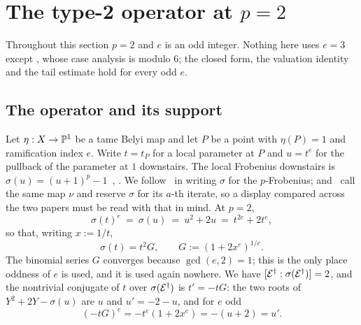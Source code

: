 
\section{The type-2 operator at \texorpdfstring{$p = 2$}{p = 2}}
\label{sec:local}

Throughout this section $p = 2$ and $e$ is an odd integer. Nothing here
uses $e = 3$ except , whose case analysis is modulo $6$;
the closed form, the valuation identity and the tail estimate hold for
every odd $e$.

\subsection{The operator and its support}
\label{sec:operator}

Let $\eta : X \to \mathbb{P}^1$ be a tame Belyi map and let $P$ be a point with
$\eta(P) = 1$ and ramification index $e$. Write $t = t_P$ for a local
parameter at $P$ and $u = t^e$ for the pullback of the parameter at $1$
downstairs. The local Frobenius downstairs is $\sigma(u) = (u+1)^p - 1$~\cite[\S4.3]{kramermillerupton2021newton},
\cite[\S3.4]{kramermiller2020abelian}. We follow~\cite{kramermillerupton2021newton} in writing $\sigma$ for the
$p$-Frobenius; \cite{kramermiller2020abelian} and~\cite{kramermiller2021padic} call the same map $\nu$ and reserve $\sigma$
for its $a$-th iterate, so a display compared across the two papers must be
read with that in mind. At $p = 2$,
\[
  \sigma(t)^e \ = \ \sigma(u) \ = \ u^2 + 2u \ = \ t^{2e} + 2t^{e},
\]
so that, writing $x := 1/t$,
\[
  \sigma(t) = t^2 G, \qquad G := (1 + 2x^e)^{1/e} .
\]
The binomial series $G$ converges because $\gcd(e,2) = 1$; this is the only
place oddness of $e$ is used, and it is used again nowhere. We have
$[\mathcal{E}^{\dagger} : \sigma(\mathcal{E}^{\dagger})] = 2$, and the nontrivial conjugate of $t$ over
$\sigma(\mathcal{E}^{\dagger})$ is $t' = -tG$: the two roots of $Y^2 + 2Y - \sigma(u)$ are
$u$ and $u' = -2-u$, and for $e$ odd
\[
  (-tG)^e = -t^e(1 + 2x^e) = -(u+2) = u' .
\]

